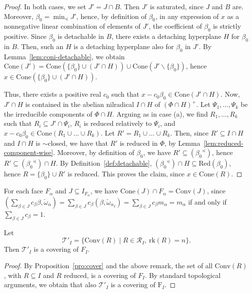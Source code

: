 \documentclass[ALCO,published]{cedram}
\theoremstyle{plain}
\newcommand\mc{\mathcal}
\newcommand\smeno{\smallsetminus}
\newcommand\conv{\mathrm{Conv}}
\newcommand\cone{\mathrm{Cone}}
\newcommand\rk{\mathrm{rk}}
\newcommand\al{\alpha}
\newcommand\be{\beta}
\newcommand\red{\mathrm{Red}}
\newcommand\preq{\preccurlyeq}
\begin{document}
\begin{proof}
\par
In both cases, we set $J'=J\cap B$.
Then $J'$ is saturated, since $J$ and $B$ are. 
Moreover, $\be_0=\min_\preq J'$, hence, by definition of $\be_0$, in any expression of $x$ as a nonnegative linear combination of elements of $J'$, the coefficient of $\be_0$ is strictly positive. 
Since $\be_0$ is detachable in $B$, there exists a  detaching  hyperplane $H$ for $\be_0$ in $B$.
Then, such an $H$ is a detaching hyperplane also for $\be_0$ in $J'$. 
By Lemma~\ref{lem:coni-detachable}, we obtain  $\cone(J')=\cone (\{\be_0\}\cup (J'\cap H))\cup \cone(J'\smeno\{\be_0\})$, hence $x\in \cone (\{\be_0\}\cup (J'\cap H))$.

\par
Thus, there exists a positive real $c_0$ such that  $x-c_0\be_0 \in \cone(J'\cap H)$. 
Now, $J'\cap H$ is contained in the abelian nilradical $I\cap H$ of  $(\Phi\cap  H)^+$.
Let $\Psi_1, \dots, \Psi_k$ be the irreducible components of $\Phi\cap  H$.
Arguing as in case (a), we find  $R_1, \dots, R_k$ such that  $R_i\subseteq J'\cap \Psi_i$, $R_i$ is reduced relatively to $\Psi_i$, and  $x-c_0\be_0 \in \cone(R_1\cup\dots\cup  R_k)$.
Let $R'=R_1\cup\dots\cup  R_k$. 
Then, since $R'\subseteq I\cap H$ and $I\cap H$ is $\sim$closed, we have that $R'$ is reduced in $\Phi$, by Lemma~\ref{lem:reduced-component-wise}.
Moreover, by definition of $\be_0$, we have $R'\subseteq ({\be_0}^\preq)$, hence $R'\subseteq({\be_0}^\preq)\cap H$. 
By Definition~\ref{def:detachable}, $({\be_0}^\preq)\cap H\subseteq \red(\be_0)$, hence 
$R=\{\be_0\}\cup R'$ is reduced. 
This proves the claim, since $x\in \cone(R)$. 
\end{proof}


\begin{rem}\label{rem:cone-conv}
For each face $F_\al$ and $J\subseteq I_{F_\al}$, we have $\cone(J)\cap F_\al=\conv(J)$, since $(\sum\limits_{\be\in J} c_\be \be, \check \omega_{\al})=\sum\limits_{\be\in J} c_\be(\be, \check \omega_{\al_I})=\sum\limits_{\be\in J} c_\be m_\al=m_\al$ if and only if $\sum\limits_{\be\in J} c_\be=1$.
\end{rem}


\begin{cor}\label{cor:cover}
Let 
$$
\mc T'_I=\{\conv(R)\mid R \in \mc R_I, \ \rk(R)=n\}.
$$
Then $\mc T'_I$ is a covering of $F_I$.
\end{cor}

\begin{proof}
By Proposition~\ref{pro:cover} and the above remark, the set of all $\conv(R)$, with $R \subseteq I$ and $R$ reduced, is a covering of $F_I$. 
By standard topological arguments, we obtain that also $\mc T'_I$ is a covering  of $\mathrm F_I$.
\end{proof}
\end{document}
